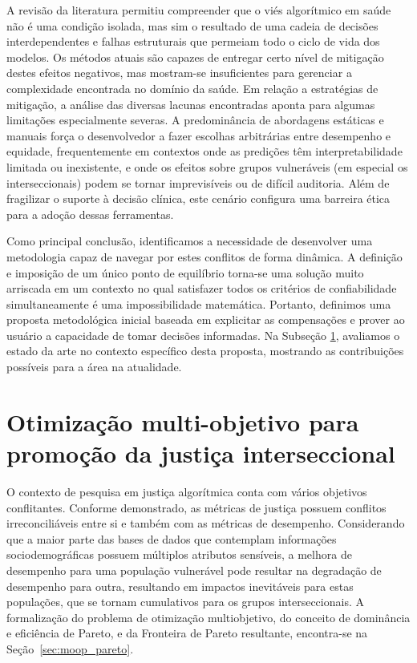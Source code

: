 A revisão da literatura permitiu compreender que o viés algorítmico em saúde não é uma condição isolada, mas sim o resultado de uma cadeia de decisões interdependentes e falhas estruturais que permeiam todo o ciclo de vida dos modelos. Os métodos atuais são capazes de entregar certo nível de mitigação destes efeitos negativos, mas mostram-se insuficientes para gerenciar a complexidade encontrada no domínio da saúde. Em relação a estratégias de mitigação, a análise das diversas lacunas encontradas aponta para algumas limitações especialmente severas. A predominância de abordagens estáticas e manuais força o desenvolvedor a fazer escolhas arbitrárias entre desempenho e equidade, frequentemente em contextos onde as predições têm interpretabilidade limitada ou inexistente, e onde os efeitos sobre grupos vulneráveis (em especial os interseccionais) podem se tornar imprevisíveis ou de difícil auditoria. Além de fragilizar o suporte à decisão clínica, este cenário configura uma barreira ética para a adoção dessas ferramentas.

Como principal conclusão, identificamos a necessidade de desenvolver uma metodologia capaz de navegar por estes conflitos de forma dinâmica. A definição e imposição de um único ponto de equilíbrio torna-se uma solução muito arriscada em um contexto no qual satisfazer todos os critérios de confiabilidade simultaneamente é uma impossibilidade matemática. Portanto, definimos uma proposta metodológica inicial baseada em explicitar as compensações e prover ao usuário a capacidade de tomar decisões informadas. Na Subseção \ref{sec:otimizacao_interseccional}, avaliamos o estado da arte no contexto específico desta proposta, mostrando as contribuições possíveis para a área na atualidade.

\section{Otimização multi-objetivo para promoção da justiça interseccional} \label{sec:otimizacao_interseccional}

O contexto de pesquisa em justiça algorítmica conta com vários objetivos conflitantes. Conforme demonstrado, as métricas de justiça possuem conflitos irreconciliáveis entre si e também com as métricas de desempenho. Considerando que a maior parte das bases de dados que contemplam informações sociodemográficas possuem múltiplos atributos sensíveis, a melhora de desempenho para uma população vulnerável pode resultar na degradação de desempenho para outra, resultando em impactos inevitáveis para estas populações, que se tornam cumulativos para os grupos interseccionais. A formalização do problema de otimização multiobjetivo, do conceito de dominância e eficiência de Pareto, e da Fronteira de Pareto resultante, encontra-se na Seção~\ref{sec:moop_pareto}.


